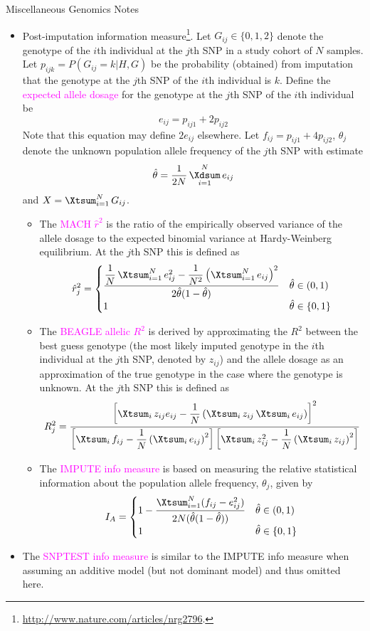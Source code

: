 \documentclass[UTF8]{book}
\date{}
\DeclareMathOperator*{\Xsum}{\mathchoice{\Xdsum}{\Xtsum}{\Xtsum}{\Xtsum}}
\newcommand{\et}{&}
\newcommand{\f}{^2}
\begin{document}
\begin{center}
\Large{Miscellaneous Genomics Notes}
\end{center}
\begin{itemize}
\item Post-imputation information measure\footnote{\url{http://www.nature.com/articles/nrg2796}.}. Let $G_{ij}\in \{0,1,2\}$ denote the genotype of the $i$th individual at the $j$th SNP in a study cohort of $N$ samples. Let $p_{ijk} = P(G_{ij}=k|H,G)$ be the probability (obtained) from imputation that the genotype at the $j$th SNP of the $i$th individual is $k$. Define the \textcolor{magenta}{expected allele dosage} for the genotype at the $j$th SNP of the $i$th individual be
$$
e_{ij} = p_{ij1} + 2p_{ij2}
$$
Note that this equation may define $2e_{ij}$ elsewhere. Let $f_{ij} = p_{ij1} + 4p_{ij2}$, $\theta_j$ denote the unknown population allele frequency of the $j$th SNP with estimate
$$
\hat{\theta} = \dfrac{1}{2N}\Xsum_{i=1}^Ne_{ij}
$$
and $X=\Xsum_{i=1}^NG_{ij}$.
\begin{itemize}
	\item The \textcolor{magenta}{MACH $\hat{r}^2$} is the ratio of the empirically observed variance of the allele dosage to the expected binomial variance at Hardy-Weinberg equilibrium. At the $j$th SNP this is defined as 
	$$
		\hat{r}_j\f = \begin{cases}
			\dfrac{\dfrac{1}{N}\Xsum_{i=1}^N e_{ij}\f - \dfrac{1}{N\f}\left(\Xsum_{i=1}^Ne_{ij}\right)\f}{2\hat{\theta}(1-\hat{\theta})} \et \hat{\theta}\in (0,1)\\
			1 \et \hat{\theta} \in \{0,1\}
		\end{cases}	
	$$
	\item The \textcolor{magenta}{BEAGLE allelic $R\f$} is derived by approximating the $R\f$ between the best guess genotype (the most likely imputed genotype in the $i$th individual at the $j$th SNP, denoted by $z_{ij}$) and the allele dosage as an approximation of the true genotype in the case where the genotype is unknown. At the $j$th SNP this is defined as 
	$$
		R_j\f = \dfrac{\left[\Xsum_iz_{ij}e_{ij}-\dfrac{1}{N}\left(\Xsum_iz_{ij}\Xsum_ie_{ij}\right)\right]\f}{\left[\Xsum_if_{ij}-\dfrac{1}{N}\left(\Xsum_ie_{ij}\right)\f\right]\left[\Xsum_iz_{ij}\f-\dfrac{1}{N}\left(\Xsum_iz_{ij}\right)\f\right]}
	$$
	\item The \textcolor{magenta}{IMPUTE info measure} is based on measuring the relative statistical information about the population allele frequency, $\theta_j$, given by
	$$
		I_A = \begin{cases}
			1 - \dfrac{\Xsum_{i=1}^N(f_{ij} - e_{ij}\f)}{2N(\hat{\theta}(1-\hat{\theta}))} \et \hat{\theta}\in(0,1) \\ 
			1 \et \hat{\theta}\in\{0,1\}
		\end{cases}	
	$$
\end{itemize}
\item The \textcolor{magenta}{SNPTEST info measure} is similar to the IMPUTE info measure when assuming an additive model (but not dominant model) and thus omitted here.
\end{itemize}
\end{document}
